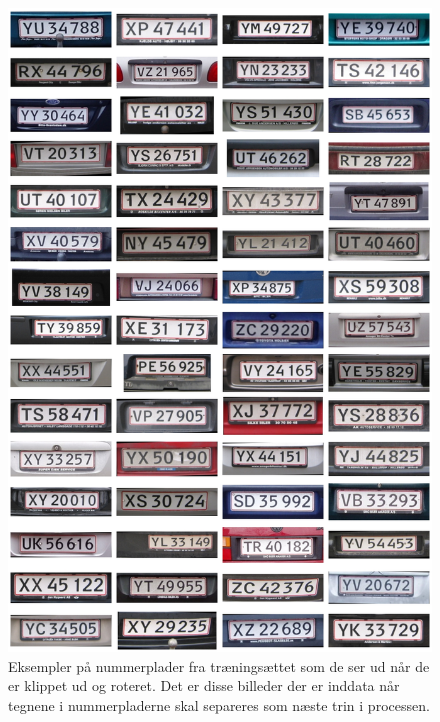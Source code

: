 \documentclass[11pt,a4paper,final]{article}
\begin{document}
\begin{figure}[htp]
\centering
\includegraphics[width=12cm]{appendix/illu/plates_rotated-1.jpg} 
\caption{Eksempler på nummerplader fra træningsættet som de ser ud når de er klippet ud og roteret. Det er disse billeder der er inddata når tegnene i nummerpladerne skal separeres som næste trin i processen.}
\label{fig:illu:plates_rotated-1}
\end{figure}
\end{document}
